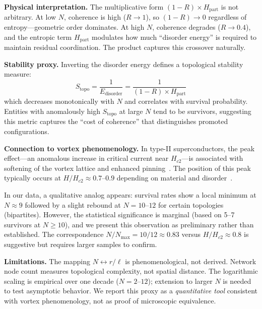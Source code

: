 \documentclass[reprint,aps,prb,superscriptaddress,floatfix]{revtex4-2}
\begin{document}
\textbf{Physical interpretation.} The multiplicative form $(1-R) \times H_{\mathrm{part}}$ is not arbitrary. At low $N$, coherence is high ($R \to 1$), so $(1-R) \to 0$ regardless of entropy---geometric order dominates. At high $N$, coherence degrades ($R \to 0.4$), and the entropic term $H_{\mathrm{part}}$ modulates how much ``disorder energy'' is required to maintain residual coordination. The product captures this crossover naturally.

\textbf{Stability proxy.} Inverting the disorder energy defines a topological stability measure:
\begin{equation}
S_{\mathrm{topo}} = \frac{1}{E_{\mathrm{disorder}}} = \frac{1}{(1-R) \times H_{\mathrm{part}}}
\label{eq:S_topo}
\end{equation}
which decreases monotonically with $N$ and correlates with survival probability. Entities with anomalously high $S_{\mathrm{topo}}$ at large $N$ tend to be survivors, suggesting this metric captures the ``cost of coherence'' that distinguishes promoted configurations.

\textbf{Connection to vortex phenomenology.} In type-II superconductors, the peak effect---an anomalous increase in critical current near $H_{c2}$---is associated with softening of the vortex lattice and enhanced pinning~\cite{Paltiel2000}. The position of this peak typically occurs at $H/H_{c2} \approx 0.7$--$0.9$ depending on material and disorder~\cite{Fasano2005}. 

In our data, a qualitative analog appears: survival rates show a local minimum at $N \approx 9$ followed by a slight rebound at $N = 10$--$12$ for certain topologies (bipartites). However, the statistical significance is marginal (based on 5--7 survivors at $N \geq 10$), and we present this observation as preliminary rather than established. The correspondence $N/N_{\max} = 10/12 \approx 0.83$ versus $H/H_{c2} \approx 0.8$ is suggestive but requires larger samples to confirm.

\textbf{Limitations.} The mapping $N \leftrightarrow r/\ell$ is phenomenological, not derived. Network node count measures topological complexity, not spatial distance. The logarithmic scaling is empirical over one decade ($N = 2$--$12$); extension to larger $N$ is needed to test asymptotic behavior. We report this proxy as a \emph{quantitative tool} consistent with vortex phenomenology, not as proof of microscopic equivalence.
\end{document}
